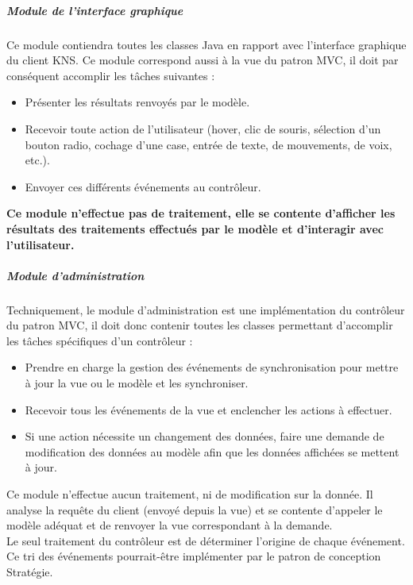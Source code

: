 \documentclass[10pt,a4paper]{report}
\begin{document}
				\subparagraph{Module de l'interface graphique}
				\begin{flushleft}
				Ce module contiendra toutes les classes Java en rapport avec l'interface graphique du client KNS. Ce module correspond aussi à la vue du patron MVC, il doit par conséquent accomplir les tâches suivantes :\\
					
					\begin{itemize}
						\item Présenter les résultats renvoyés par le modèle.
						\item Recevoir toute action de l'utilisateur (hover, clic de souris, sélection d'un bouton radio, cochage d'une case, entrée de texte, de mouvements, de voix, etc.).
						\item Envoyer ces différents événements au contrôleur. 
					\end{itemize}
					
					\textbf{Ce module n'effectue pas de traitement, elle se contente d'afficher les résultats des traitements effectués par le modèle et d'interagir avec l'utilisateur.}\\
				\end{flushleft}
				
				\subparagraph{Module d'administration}
				\begin{flushleft}
				Techniquement, le module d'administration est une implémentation du contrôleur du patron MVC, il doit donc contenir toutes les classes permettant d'accomplir les tâches spécifiques d'un contrôleur :
				
				\begin{itemize}
					\item Prendre en charge la gestion des événements de synchronisation pour mettre à jour la vue ou le modèle et les synchroniser. 
					\item Recevoir tous les événements de la vue et enclencher les actions à effectuer. 
					\item Si une action nécessite un changement des données, faire une demande de modification des données au modèle afin que les données affichées se mettent à jour. 
				\end{itemize}
				
Ce module n'effectue aucun traitement, ni de modification sur la donnée. Il analyse la requête du client (envoyé depuis la vue) et se contente d'appeler le modèle adéquat et de renvoyer la vue correspondant à la demande.\\
Le seul traitement du contrôleur est de déterminer l'origine de chaque événement. Ce tri des événements pourrait-être implémenter par le patron de conception Stratégie.
				\end{flushleft}
	
\end{document}
